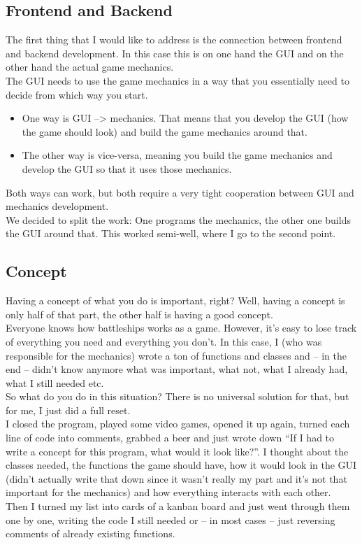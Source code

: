 \documentclass[12pt]{scrartcl}
\begin{document}
	\subsection{Frontend and Backend}
	The first thing that I would like to address is the connection between frontend and backend development. In this case this is on one hand the GUI and on the other hand the actual game mechanics.\\
	The GUI needs to use the game mechanics in a way that you essentially need to decide from which way you start.
	\begin{itemize}
		\item One way is GUI --> mechanics. That means that you develop the GUI (how the game should look) and build the game mechanics around that.
		\item The other way is vice-versa, meaning you build the game mechanics and develop the GUI so that it uses those mechanics.
	\end{itemize}

	Both ways can work, but both require a very tight cooperation between GUI and mechanics development. \\

	We decided to split the work: One programs the mechanics, the other one builds the GUI around that. This worked semi-well, where I go to the second point.

	\subsection{Concept}
	Having a concept of what you do is important, right? Well, having a concept is only half of that part, the other half is having a good concept. \\

	Everyone knows how battleships works as a game. However, it's easy to lose track of everything you need and everything you don't. In this case, I (who was responsible for the mechanics) wrote a ton of functions and classes and -- in the end -- didn't know anymore what was important, what not, what I already had, what I still needed etc.\\

	So what do you do in this situation? There is no universal solution for that, but for me, I just did a full reset.\\
	I closed the program, played some video games, opened it up again, turned each line of code into comments, grabbed a beer and just wrote down \enquote{If I had to write a concept for this program, what would it look like?}. I thought about the classes needed, the functions the game should have, how it would look in the GUI (didn't actually write that down since it wasn't really my part and it's not that important for the mechanics) and how everything interacts with each other. \\
	Then I turned my list into cards of a kanban board and just went through them one by one, writing the code I still needed or -- in most cases -- just reversing comments of already existing functions. \\
\end{document}
